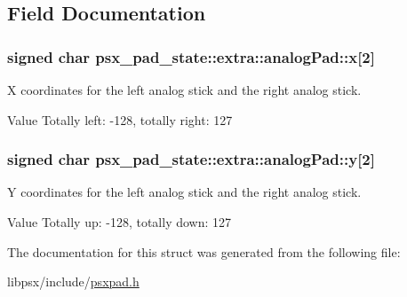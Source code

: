 \subsection{Field Documentation}
\hypertarget{structpsx__pad__state_1_1extra_1_1analogPad_a9f1cce7fb30ad35f6b58a3f3219cbdc4}{}
\subsubsection[{x}]{\setlength{\rightskip}{0pt plus 5cm}signed char psx\+\_\+pad\+\_\+state\+::extra\+::analog\+Pad\+::x\mbox{[}2\mbox{]}}\label{structpsx__pad__state_1_1extra_1_1analogPad_a9f1cce7fb30ad35f6b58a3f3219cbdc4}


X coordinates for the left analog stick and the right analog stick. 

\begin{DoxyParagraph}{Value }
Totally left\+: -\/128, totally right\+: 127 
\end{DoxyParagraph}
\hypertarget{structpsx__pad__state_1_1extra_1_1analogPad_a4c3c2de2ba57dfb45bfc1d0d59a3d14a}{}
\subsubsection[{y}]{\setlength{\rightskip}{0pt plus 5cm}signed char psx\+\_\+pad\+\_\+state\+::extra\+::analog\+Pad\+::y\mbox{[}2\mbox{]}}\label{structpsx__pad__state_1_1extra_1_1analogPad_a4c3c2de2ba57dfb45bfc1d0d59a3d14a}


Y coordinates for the left analog stick and the right analog stick. 

\begin{DoxyParagraph}{Value }
Totally up\+: -\/128, totally down\+: 127 
\end{DoxyParagraph}


The documentation for this struct was generated from the following file\+:\begin{DoxyCompactItemize}
\item 
libpsx/include/\hyperlink{psxpad_8h}{psxpad.\+h}\end{DoxyCompactItemize}
